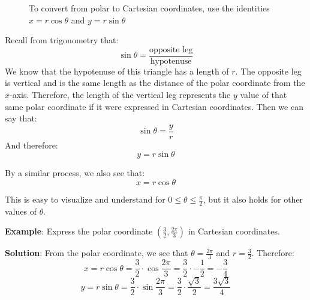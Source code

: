 \begin{figure}[htbp]
\centering
    \label{fig:polar_to_cart}
    \caption{To convert from polar to Cartesian coordinates, use the identities 
    $x = r\cos{\theta}$ and $y = r\sin{\theta}$}
    \end{figure}

Recall from trigonometry that:
$$\sin{\theta} = \frac{\text{opposite leg}}{\text{hypotenuse}}$$
We know that the hypotenuse of this triangle has a length of $r$. The opposite 
leg is vertical and is the same length as the distance of the polar coordinate 
from the $x$-axis. Therefore, the length of the vertical leg represents the 
$y$ value of that same polar coordinate if it were expressed in Cartesian 
coordinates. Then we can say that:
$$\sin{\theta} = \frac{y}{r}$$
And therefore:
$$y = r\sin{\theta}$$

By a similar process, we also see that:
$$x = r\cos{\theta}$$

This is easy to visualize and understand for $0 \leq \theta \leq \frac{\pi}{
2}$, but it also holds for other values of $\theta$. 

\textbf{Example}: Express the polar coordinate $(\frac{3}{2}, \frac{2\pi}{3})$ 
in Cartesian coordinates.

\textbf{Solution}: From the polar coordinate, we see that $\theta = \frac{2\pi
}{3}$ and $r = \frac{3}{2}$. Therefore:
$$x = r\cos{\theta} = \frac{3}{2} \cdot \cos{\frac{2\pi}{3}} = \frac{3}{2} 
\cdot -\frac{1}{2} = -\frac{3}{4}$$
$$y = r\sin{\theta} = \frac{3}{2} \cdot \sin{\frac{2\pi}{3}} = \frac{3}{2} 
\cdot \frac{\sqrt{3}}{2} = \frac{3\sqrt{3}}{4}$$

